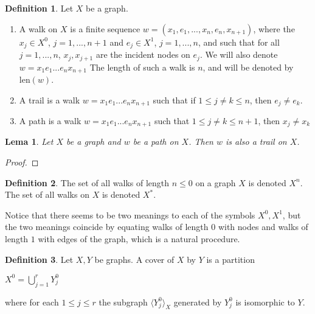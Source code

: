 \documentclass[]{article}
\newtheorem{lemma}{Lema}[section]
\theoremstyle{definition}
\newtheorem{definition}{Definition}[section]
\theoremstyle{definition}
\begin{document}
\begin{definition}
	Let $X$ be a graph.
	
	\begin{enumerate}
		\item A walk on $X$ is a finite sequence $w = (x_1, e_1, ..., x_{n}, e_{n}, x_{n+1})$, where the $x_j \in X^0$, $j=1, ..., n+1$ and $e_j \in X^1$, $j=1, ..., n$, and such that for all $j=1,...,n$, $x_j, x_{j+1}$ are the incident nodes on $e_j$. We will also denote $w = x_1e_1...e_nx_{n+1}$ The length of such a walk is $n$, and will be denoted by $\text{len}(w)$.
		
		\item A trail is a walk $ w = x_1e_1...e_nx_{n+1}$ such that if $1 \leq j \neq k \leq n$, then $e_j \neq e_k$.
		
		\item A path is a walk $w = x_1e_1...e_nx_{n+1}$ such that $1 \leq j \neq k \leq n+1$, then $x_j \neq x_k$ 
	\end{enumerate}
\end{definition}

\begin{lemma}
	Let $X$ be a graph and $w$ be a path on $X$. Then $w$ is also a trail on $X$.
\end{lemma}

\begin{proof}
	
	
\end{proof}

\begin{definition}
	The set of all walks of length $n \leq 0$ on a graph $X$ is denoted $X^n$. The set of all walks on $X$ is denoted $X^*$.
\end{definition}

Notice that there seems to be two meanings to each of the symbols $X^0, X^1$, but the two meanings coincide by equating walks of length $0$ with nodes and walks of length $1$ with edges of the graph, which is a natural procedure.

\begin{definition}
	Let $X, Y$ be graphs. A cover of $X$ by $Y$ is a partition 
	
	\begin{center}
		$X^0=\bigcup_{j=1}^r Y^0_j$
	\end{center}
	
	\noindent where for each $1 \leq j \leq r$ the subgraph $\langle Y^0_j \rangle_X$ generated by $Y_j^0$ is isomorphic to $Y$.
\end{definition}
\end{document}
